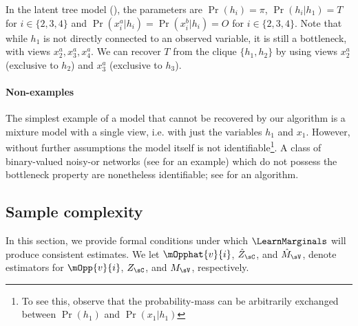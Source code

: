In the latent tree model (), the parameters
are $\Pr(h_i) = \pi$, $\Pr(h_i | h_1) = T$ for $i \in \{2,3,4\}$
and $\Pr(x^a_i | h_i) = \Pr(x^b_i | h_i) = O$ for $i \in \{2,3,4\}$.
Note that while $h_1$ is not directly connected to an observed variable,
  it is still a bottleneck, with views $x^a_2, x^a_3, x^a_4$.
We can recover $T$ from the clique $\{h_1, h_2\}$ by using views $x^a_2$
  (exclusive to $h_2$) and $x^a_3$ (exclusive to $h_3$).


\paragraph{Non-examples}
\label{sec:non-example}

The simplest example of a model that cannot be recovered by our algorithm is
  a mixture model with a single view, i.e.  with
  just the variables $h_1$ and $x_1$.
However, without further assumptions the model itself is not
  identifiable\footnote{To see this, observe that the probability-mass
  can be arbitrarily exchanged between $\Pr(h_1)$ and $\Pr(x_1 | h_1)$}.
A class of binary-valued noisy-or networks
(see  for an example)
which do not possess the
  bottleneck property are nonetheless identifiable;
  see \citet{halpern13noisyor} for an algorithm.

\subsection{Sample complexity}
\label{sec:sampleComplexity}

In this section, we provide formal conditions under which $\LearnMarginals$
will produce consistent estimates.
We let
$\mOpphat{v}{i}$,
$\hat Z_\sC$,
and $\hat M_\sV$,
denote estimators for
$\mOpp{v}{i}$,
$Z_\sC$,
and $M_\sV$,
respectively.

